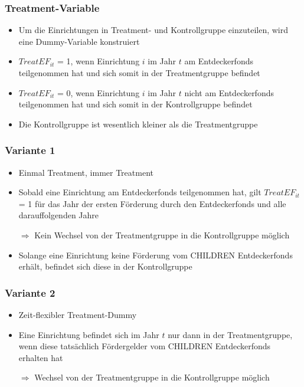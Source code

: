 \begin{frame}[fragile]
\frametitle{Treatment-Variable}
\begin{itemize}
\item Um die Einrichtungen in Treatment- und Kontrollgruppe einzuteilen, wird eine Dummy-Variable konstruiert
\item $TreatEF_{it}$ = 1, wenn Einrichtung $i$ im Jahr $t$ am Entdeckerfonds teilgenommen hat und sich somit in der Treatmentgruppe befindet
\item $TreatEF_{it}$ = 0, wenn Einrichtung $i$ im Jahr $t$ nicht am Entdeckerfonds teilgenommen hat und sich somit in der Kontrollgruppe befindet
\item Die Kontrollgruppe ist wesentlich kleiner als die Treatmentgruppe
\end{itemize}
\end{frame}

\begin{frame}[fragile]
\frametitle{Variante 1}
\begin{itemize}
\item \glqq Einmal Treatment, immer Treatment\grqq
\item Sobald eine Einrichtung am Entdeckerfonds teilgenommen hat, gilt $TreatEF_{it}$ = 1 für das Jahr der ersten Förderung durch den Entdeckerfonds und alle darauffolgenden Jahre
\item [$\Rightarrow$] Kein Wechsel von der Treatmentgruppe in die Kontrollgruppe möglich
\item Solange eine Einrichtung keine Förderung vom CHILDREN Entdeckerfonds erhält, befindet sich diese in der Kontrollgruppe
\end{itemize}
\end{frame}

\begin{frame}[fragile]
\frametitle{Variante 2}
\begin{itemize}
\item Zeit-flexibler Treatment-Dummy
\item Eine Einrichtung befindet sich im Jahr $t$ nur dann in der Treatmentgruppe, wenn diese tatsächlich Fördergelder vom CHILDREN Entdeckerfonds erhalten hat
\item [$\Rightarrow$] Wechsel von der Treatmentgruppe in die Kontrollgruppe möglich
\end{itemize}
\end{frame}

